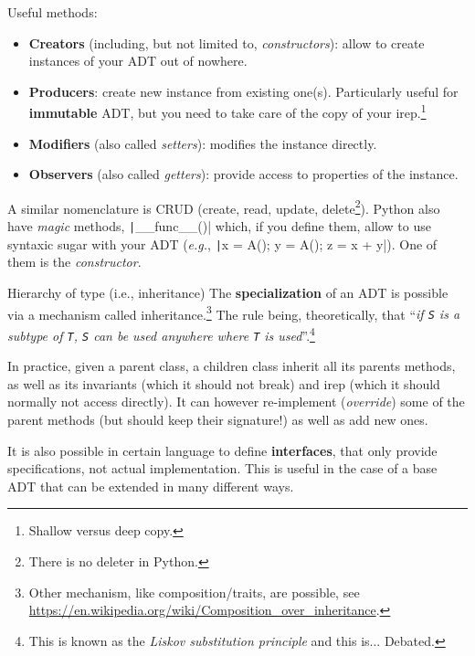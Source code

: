 \documentclass[10pt,
aspectratio=169
]{beamer}
\begin{document}
\begin{frame}
	Useful methods:\begin{itemize}
		\item \textbf{Creators} (including, but not limited to, \textit{constructors}): allow to create instances of your ADT out of nowhere.
		\item \textbf{Producers}: create new instance from existing one(s). Particularly useful for \textbf{immutable} ADT, but you need to take care of the copy of your irep.\footnote{Shallow versus deep copy.}
		\item \textbf{Modifiers} (also called \textit{setters}): modifies the instance directly.
		\item \textbf{Observers} (also called \textit{getters}): provide access to properties of the instance.
	\end{itemize}
	A similar nomenclature is CRUD (create, read, update, delete\footnote{There is no deleter in Python.}). Python also have \textit{magic} methods, \texttt|__func__()| which, if you define them, allow to use syntaxic sugar with your ADT (\textit{e.g.}, \texttt|x = A(); y = A(); z = x + y|). One of them is the \textit{constructor}.
\end{frame}

\begin{frame}{Hierarchy of type (i.e., inheritance)}
	The \textbf{specialization} of an ADT is possible via a mechanism called inheritance.\footnote{Other mechanism, like composition/traits, are possible, see \url{https://en.wikipedia.org/wiki/Composition_over_inheritance}.} The rule being, theoretically, that ``\emph{if \texttt{S} is a subtype of \texttt{T}, \texttt{S} can be used anywhere where \texttt{T} is used}''.\footnote{This is known as the \textit{Liskov substitution principle} and this is... Debated.}
	
	In practice, given a parent class,  a children class inherit all its parents methods, as well as its invariants (which it should not break) and irep (which it should normally not access directly). It can however re-implement (\textit{override}) some of the parent methods (but should keep their signature!) as well as add new ones.
	
	It is also possible in certain language to define \textbf{interfaces}, that only provide specifications, not actual implementation. This is useful in the case of a base ADT that can be extended in many different ways.
\end{frame}
\end{document}
